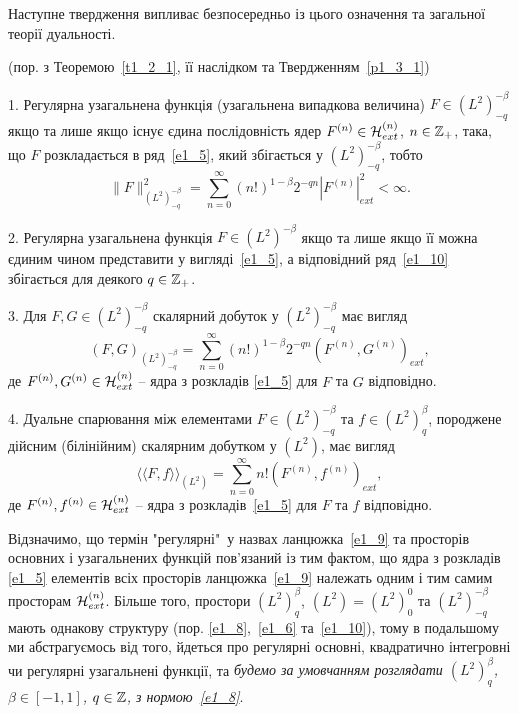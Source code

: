 Наступне твердження випливає безпосередньо із цього означення та загальної теорії
дуальності.
\begin{subproposition}{\rm (пор. з Теоремою~\ref{t1_2_1}, її наслідком та
Твердженням~\ref{p1_3_1})}

1. Регулярна узагальнена функція (узагальнена випадкова величина) $F\in (L^2)^{-\beta}_{-q}$
якщо та лише якщо існує єдина послідовність ядер $F^{(n)}\in\mathcal{H}_{ext}^{(n)}$,
$n\in\mathbb{Z}_+$, така, що $F$ розкладається в ряд~\eqref{e1_5}, який збігається у
$(L^2)^{-\beta}_{-q}$, тобто
\begin{equation}\label{e1_10}
\|F\|_{(L^2)^{-\beta}_{-q}}^2
=\sum_{n=0}^\infty (n!)^{1-\beta}2^{-qn}|F^{(n)}|_{ext}^2<\infty.
\end{equation}

2. Регулярна узагальнена функція $F\in (L^2)^{-\beta}$ якщо та лише якщо її можна єдиним
чином представити у вигляді~\eqref{e1_5}, а відповідний ряд~\eqref{e1_10} збігається для
деякого $q\in\mathbb{Z}_+$.

3. Для $F,G\in (L^2)^{-\beta}_{-q}$ скалярний добуток у $(L^2)^{-\beta}_{-q}$
має вигляд
\begin{equation*}
(F,G)_{(L^2)^{-\beta}_{-q}}
=\sum_{n=0}^\infty (n!)^{1-\beta}2^{-qn}
(F^{(n)},G^{(n)})_{ext},
\end{equation*}
де $F^{(n)},G^{(n)}\in\mathcal{H}_{ext}^{(n)}$ -- ядра з розкладів
\eqref{e1_5} для $F$ та $G$ відповідно.

4. Дуальне спарювання між елементами $F\in (L^2)^{-\beta}_{-q}$ та
$f\in (L^2)^\beta_q$, породжене дійсним (білінійним) скалярним добутком у $(L^2)$,
має вигляд
\begin{equation*}
\langle\!\langle F,f\rangle\!\rangle_{(L^2)}
=\sum_{n=0}^\infty n!(F^{(n)},f^{(n)})_{ext},
\end{equation*}
де $F^{(n)},f^{(n)}\in\mathcal{H}_{ext}^{(n)}$ --
ядра з розкладів~\eqref{e1_5} для $F$ та $f$ відповідно.
\end{subproposition}

Відзначимо, що термін "регулярні"\ у назвах ланцюжка~\eqref{e1_9} та просторів
основних і узагальнених функцій пов'язаний із тим фактом, що ядра з розкладів
\eqref{e1_5} елементів всіх просторів ланцюжка~\eqref{e1_9} належать одним і тим
самим просторам $\mathcal{H}_{ext}^{(n)}$. Більше того, простори $(L^2)^\beta_q$,
$(L^2)=(L^2)^0_0$ та $(L^2)^{-\beta}_{-q}$ мають однакову структуру (пор.
\eqref{e1_8},~\eqref{e1_6} та~\eqref{e1_10}), тому в подальшому ми абстрагуємось від того,
йдеться про регулярні основні, квадратично інтегровні чи регулярні узагальнені
функції, та {\it будемо за умовчанням розглядати $(L^2)^\beta_q$, $\beta\in [-1,1]$,
$q\in\mathbb{Z}$, з нормою~\eqref{e1_8}}.

